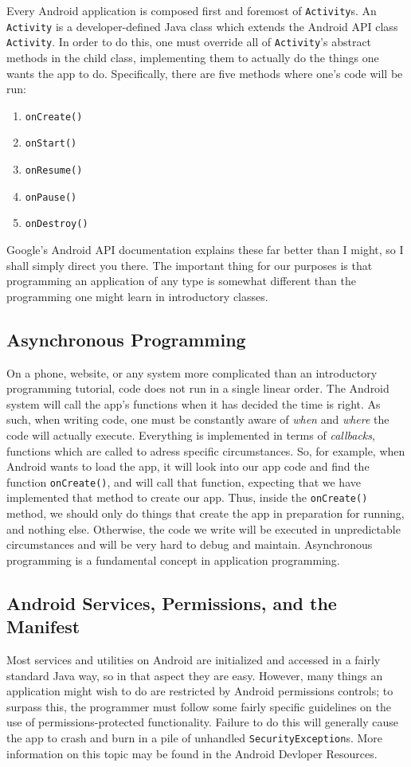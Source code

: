 Every Android application is composed first and foremost of \verb|Activity|s. An \verb|Activity| is a developer-defined Java class which extends the 
Android API class \verb|Activity|. In order to do this, one must override all of \verb|Activity|'s abstract methods in the child class, implementing them
to actually do the things one wants the app to do. Specifically, there are five methods where one's code will be run:

\begin{enumerate}
\item{\verb|onCreate()|}
\item{\verb|onStart()|}
\item{\verb|onResume()|}
\item{\verb|onPause()|}
\item{\verb|onDestroy()|}
\end{enumerate}

Google's Android API documentation explains these far better than I might, so I shall simply direct you there.\cite{androidRefIndex} The important thing for our
purposes is that programming an application of any type is somewhat different than the programming one might learn in introductory classes.

\subsection{Asynchronous Programming}
On a phone, website, or any system more complicated than an introductory programming tutorial, code does not run in a single linear order.
The Android system will call the app's functions when it has decided the time is right. As such, when writing code, one must be constantly
aware of \emph{when} and \emph{where} the code will actually execute. Everything is implemented in terms of \emph{callbacks}, functions which
are called to adress specific circumstances. So, for example, when Android wants to load the app, it will look into our app code and find
the function \verb|onCreate()|, and will call that function, expecting that we have implemented that method to create our app. Thus, inside
the \verb|onCreate()| method, we should only do things that create the app in preparation for running, and nothing else. Otherwise, 
the code we write will be executed in unpredictable circumstances and will be very hard to debug and maintain. Asynchronous programming is
a fundamental concept in application programming. 

\subsection{Android Services, Permissions, and the Manifest}
Most services and utilities on Android are initialized and accessed in a fairly standard Java way, so in that aspect they are easy. However, many things an application might
wish to do are restricted by Android permissions controls; to surpass this, the programmer must follow some fairly specific guidelines on the use of permissions-protected 
functionality. Failure to do this will generally cause the app to crash and burn in a pile of unhandled \verb|SecurityException|s. More information on this topic may be found
in the Android Devloper Resources.\cite{androidPermissions}

